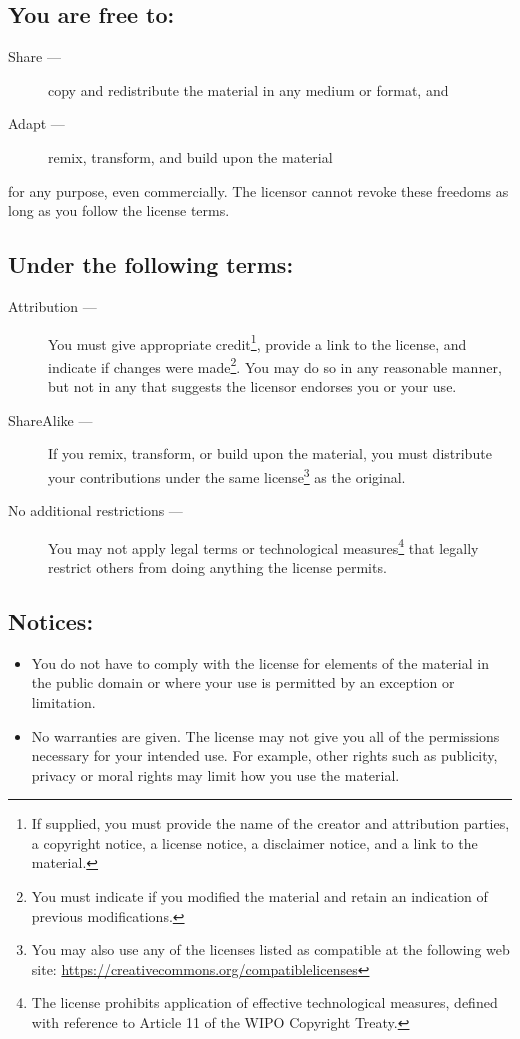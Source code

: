 \documentclass[letterpaper,twoside]{article}
\begin{document}
\subsection{You are free to:}
\begin{description}
\item[Share ---]copy and redistribute the material in any medium or format, and
\item[Adapt ---]remix, transform, and build upon the material
\end{description}
for any purpose, even commercially.  The licensor cannot revoke these
freedoms as long as you follow the license terms.
\subsection{Under the following terms:}
\begin{description}
\item[Attribution ---]You must give appropriate credit\footnote{If supplied,
  you must provide the name of the creator and attribution parties,
  a copyright notice, a license notice, a disclaimer notice, and a link
  to the material.}, provide a link to
  the license, and indicate if changes were made\footnote{You must indicate if
    you modified the material and retain an indication of previous
    modifications.}.  You may do so in any
  reasonable manner, but not in any that suggests the licensor endorses you
  or your use.
\item[ShareAlike ---]If you remix, transform, or build upon the material,
  you must distribute your contributions under the same
  license\footnote{You may also use any of the licenses listed as compatible
    at the following web site:
    \url{https://creativecommons.org/compatiblelicenses}}
  as the original.
\item[No additional restrictions ---]You may not apply legal terms or
  technological measures\footnote{The license prohibits application of
    effective technological measures, defined with reference to Article 11
    of the WIPO Copyright Treaty.}
  that legally restrict others from doing anything
  the license permits.
\end{description}
\subsection{Notices:}
\begin{itemize}
\item{You do not have to comply with the license for elements of the
  material in the public domain or where your use is permitted by an
  exception or limitation.}
\item{No warranties are given.  The license may not give you all of the
  permissions necessary for your intended use.  For example, other rights
  such as publicity, privacy or moral rights may limit how you use the
  material.}
\end{itemize}
\end{document}
